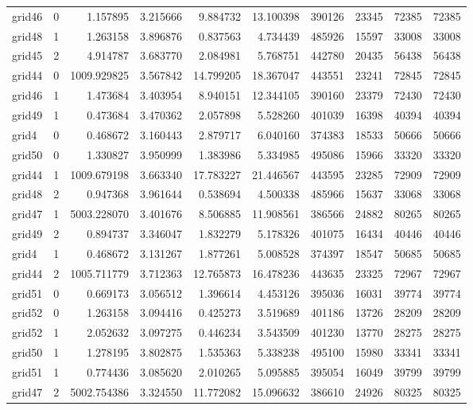 \begin{longtable}{|l|r|r|r|r|r|r|r|r|r|}
grid46 & 0 & 1.157895 & 3.215666 & 9.884732 & 13.100398 & 390126 & 23345 & 72385 & 72385 \\
grid48 & 1 & 1.263158 & 3.896876 & 0.837563 & 4.734439 & 485926 & 15597 & 33008 & 33008 \\
grid45 & 2 & 4.914787 & 3.683770 & 2.084981 & 5.768751 & 442780 & 20435 & 56438 & 56438 \\
grid44 & 0 & 1009.929825 & 3.567842 & 14.799205 & 18.367047 & 443551 & 23241 & 72845 & 72845 \\
grid46 & 1 & 1.473684 & 3.403954 & 8.940151 & 12.344105 & 390160 & 23379 & 72430 & 72430 \\
grid49 & 1 & 0.473684 & 3.470362 & 2.057898 & 5.528260 & 401039 & 16398 & 40394 & 40394 \\
grid4 & 0 & 0.468672 & 3.160443 & 2.879717 & 6.040160 & 374383 & 18533 & 50666 & 50666 \\
grid50 & 0 & 1.330827 & 3.950999 & 1.383986 & 5.334985 & 495086 & 15966 & 33320 & 33320 \\
grid44 & 1 & 1009.679198 & 3.663340 & 17.783227 & 21.446567 & 443595 & 23285 & 72909 & 72909 \\
grid48 & 2 & 0.947368 & 3.961644 & 0.538694 & 4.500338 & 485966 & 15637 & 33068 & 33068 \\
grid47 & 1 & 5003.228070 & 3.401676 & 8.506885 & 11.908561 & 386566 & 24882 & 80265 & 80265 \\
grid49 & 2 & 0.894737 & 3.346047 & 1.832279 & 5.178326 & 401075 & 16434 & 40446 & 40446 \\
grid4 & 1 & 0.468672 & 3.131267 & 1.877261 & 5.008528 & 374397 & 18547 & 50685 & 50685 \\
grid44 & 2 & 1005.711779 & 3.712363 & 12.765873 & 16.478236 & 443635 & 23325 & 72967 & 72967 \\
grid51 & 0 & 0.669173 & 3.056512 & 1.396614 & 4.453126 & 395036 & 16031 & 39774 & 39774 \\
grid52 & 0 & 1.263158 & 3.094416 & 0.425273 & 3.519689 & 401186 & 13726 & 28209 & 28209 \\
grid52 & 1 & 2.052632 & 3.097275 & 0.446234 & 3.543509 & 401230 & 13770 & 28275 & 28275 \\
grid50 & 1 & 1.278195 & 3.802875 & 1.535363 & 5.338238 & 495100 & 15980 & 33341 & 33341 \\
grid51 & 1 & 0.774436 & 3.085620 & 2.010265 & 5.095885 & 395054 & 16049 & 39799 & 39799 \\
grid47 & 2 & 5002.754386 & 3.324550 & 11.772082 & 15.096632 & 386610 & 24926 & 80325 & 80325 \\

\end{longtable}
